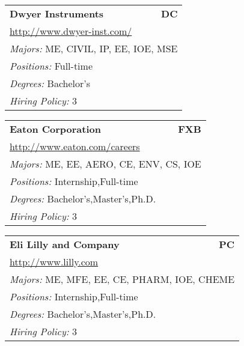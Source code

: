 \documentclass[twoside]{article}
\begin{document}
\begin{center}
\begin{multicols}{3}
\begin{FlushLeft}
\begin{minipage}{\columnwidth}
\end{minipage}
 
\begin{minipage}{\columnwidth}\begin{tabularx}{.95\columnwidth}{Xr}
                 {\Large\bf Dwyer Instruments} & {\Large\bf DC}\\
    \multicolumn{2}{p{.95\columnwidth}}{\url{http://www.dwyer-inst.com/}}\\
    \multicolumn{2}{p{.95\columnwidth}}{\emph{Majors:} ME, CIVIL, IP, EE, IOE, MSE}\\
    \multicolumn{2}{p{.95\columnwidth}}{\emph{Positions:} Full-time}\\
    \multicolumn{2}{p{.95\columnwidth}}{\emph{Degrees:} Bachelor's}\\
    \multicolumn{2}{p{.95\columnwidth}}{\emph{Hiring Policy:} 3}\\
    \end{tabularx}
    
\end{minipage}
 
\begin{minipage}{\columnwidth}\begin{tabularx}{.95\columnwidth}{Xr}
                 {\Large\bf Eaton Corporation} & {\Large\bf FXB}\\
    \multicolumn{2}{p{.95\columnwidth}}{\url{http://www.eaton.com/careers}}\\
    \multicolumn{2}{p{.95\columnwidth}}{\emph{Majors:} ME, EE, AERO, CE, ENV, CS, IOE}\\
    \multicolumn{2}{p{.95\columnwidth}}{\emph{Positions:} Internship,Full-time}\\
    \multicolumn{2}{p{.95\columnwidth}}{\emph{Degrees:} Bachelor's,Master's,Ph.D.}\\
    \multicolumn{2}{p{.95\columnwidth}}{\emph{Hiring Policy:} 3}\\
    \end{tabularx}
    
\end{minipage}
 
\begin{minipage}{\columnwidth}\begin{tabularx}{.95\columnwidth}{Xr}
                 {\Large\bf Eli Lilly and Company} & {\Large\bf PC}\\
    \multicolumn{2}{p{.95\columnwidth}}{\url{http://www.lilly.com}}\\
    \multicolumn{2}{p{.95\columnwidth}}{\emph{Majors:} ME, MFE, EE, CE, PHARM, IOE, CHEME}\\
    \multicolumn{2}{p{.95\columnwidth}}{\emph{Positions:} Internship,Full-time}\\
    \multicolumn{2}{p{.95\columnwidth}}{\emph{Degrees:} Bachelor's,Master's,Ph.D.}\\
    \multicolumn{2}{p{.95\columnwidth}}{\emph{Hiring Policy:} 3}\\
    \end{tabularx}
    

\end{minipage}
\end{FlushLeft}
\end{multicols}
\end{center}
\end{document}
